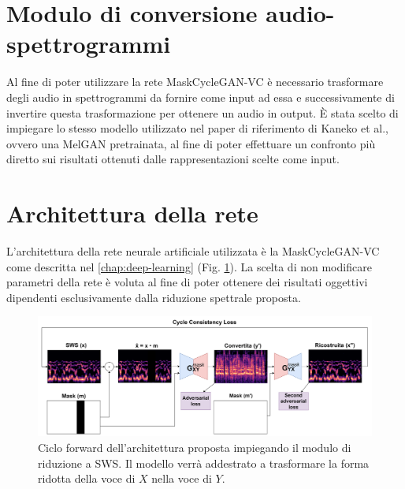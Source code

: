 		\section{Modulo di conversione audio-spettrogrammi}
		Al fine di poter utilizzare la rete MaskCycleGAN-VC è necessario trasformare degli audio in spettrogrammi da fornire come input ad essa e successivamente di invertire questa trasformazione per ottenere un audio in output. È stata scelto di impiegare lo stesso modello utilizzato nel paper di riferimento di Kaneko et al.\cite{MaskCyclegan-VC}, ovvero una MelGAN\cite{melgan} pretrainata, al fine di poter effettuare un confronto più diretto sui risultati ottenuti dalle rappresentazioni scelte come input.
	
		\section{Architettura della rete}
		L'architettura della rete neurale artificiale utilizzata è la MaskCycleGAN-VC come descritta nel \autoref{chap:deep-learning} (Fig. \ref{fig:maskcyclegan-sws-vc}).		
		La scelta di non modificare parametri della rete è voluta al fine di poter ottenere dei risultati oggettivi dipendenti esclusivamente dalla riduzione spettrale proposta.
		
		\begin{figure}[h]
			\centering
			\includegraphics[width=1\linewidth]{figures/MaskCycleGAN-SWS-VC}
			\caption{Ciclo forward dell'architettura proposta impiegando il modulo di riduzione a SWS. Il modello verrà addestrato a trasformare la forma ridotta della voce di $X$ nella voce di $Y$.}
			\label{fig:maskcyclegan-sws-vc}
		\end{figure}

